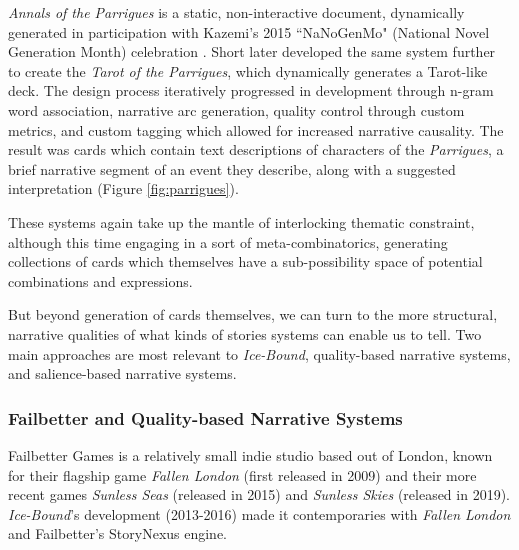 \textit{Annals of the Parrigues} is a static, non-interactive document, dynamically generated in participation with Kazemi's 2015 ``NaNoGenMo" (National Novel Generation Month) celebration \cite{kazemi_2015}. Short later developed the same system further to create the \textit{Tarot of the Parrigues}, which dynamically generates a Tarot-like deck. The design process iteratively progressed in development through n-gram word association, narrative arc generation, quality control through custom metrics, and custom tagging which allowed for increased narrative causality. The result was cards which contain text descriptions of characters of the \textit{Parrigues}, a brief narrative segment of an event they describe, along with a suggested interpretation (Figure \ref{fig:parrigues}).

These systems again take up the mantle of interlocking thematic constraint, although this time engaging in a sort of meta-combinatorics, generating collections of cards which themselves have a sub-possibility space of potential combinations and expressions.

But beyond generation of cards themselves, we can turn to the more structural, narrative qualities of what kinds of stories systems can enable us to tell. Two main approaches are most relevant to \textit{Ice-Bound}, quality-based narrative systems, and salience-based narrative systems.
\subsubsection{Failbetter and Quality-based Narrative Systems}\label{subsubsec:failbetter-and-qbn-systems}

Failbetter Games is a relatively small indie studio based out of London, known for their flagship game \textit{Fallen London} (first released in 2009) and their more recent games \textit{Sunless Seas} (released in 2015) and \textit{Sunless Skies} (released in 2019). \textit{Ice-Bound}'s development (2013-2016) made it contemporaries with \textit{Fallen London} and Failbetter's StoryNexus engine. 


